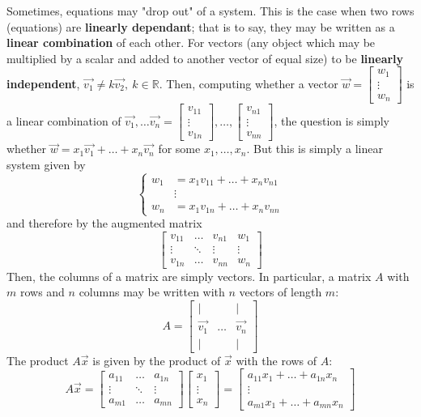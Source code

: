 Sometimes, equations may "drop out" of a system. This is the case when two rows (equations) are \textbf{linearly dependant}; that is to say, they may be written as a \textbf{linear combination} of each other. For vectors (any object which may be multiplied by a scalar and added to another vector of equal size) to be \textbf{linearly independent}, $\vec{v_1} \neq k\vec{v_2},\ k\in\mathbb{R}$. Then, computing whether a vector $\vec{w} = \begin{bmatrix}
    w_1\\
    \vdots\\
    w_n
\end{bmatrix}$ is a linear combination of $\vec{v_1},\dots\vec{v_n} = \begin{bmatrix}
    v_{11}\\
    \vdots\\
    v_{1n}
\end{bmatrix},\dots,\begin{bmatrix}
    v_{n1}\\
    \vdots\\
    v_{nn}
\end{bmatrix}$, the question is simply whether $\vec{w} = x_1\vec{v_1}+\dots+x_n\vec{v_n}$ for some $x_1,\dots,x_n$. But this is simply a linear system given by \[\begin{cases}
    w_1 &= x_1v_{11} + \dots +x_nv_{n1}\\
    &\vdots\\
    w_n &= x_1v_{1n} + \dots + x_nv_{nn}
\end{cases}\] and therefore by the augmented matrix \[\left[\begin{array}{ccc|c}
v_{11} & \dots & v_{n1} & w_1\\
\vdots & \ddots & \vdots & \vdots\\
v_{1n} & \dots & v_{nn} & w_n
\end{array}\right]\]
Then, the columns of a matrix are simply vectors. In particular, a matrix $A$ with $m$ rows and $n$ columns may be written with $n$ vectors of length $m$: \[A = \left[\begin{array}{ccc}
    | &  & |\\
    \vec{v_1} & \dots & \vec{v_n}\\
    | &  & |
\end{array}\right]\] The product $A\vec{x}$ is given by the product of $\vec{x}$ with the rows of $A$:
\[A\vec{x} = \left[\begin{array}{ccc}
    a_{11} & \dots & a_{1n}\\
    \vdots & \ddots & \vdots\\
    a_{m1} & \dots & a_{mn}
\end{array}\right]\left[\begin{array}{c}
     x_1  \\
     \vdots\\
     x_n
\end{array}\right] = \left[\begin{array}{c}
     a_{11}x_1 + \dots + a_{1n}x_n  \\
     \vdots\\
     a_{m1}x_1 + \dots + a_{mn}x_n
\end{array}\right]\]
